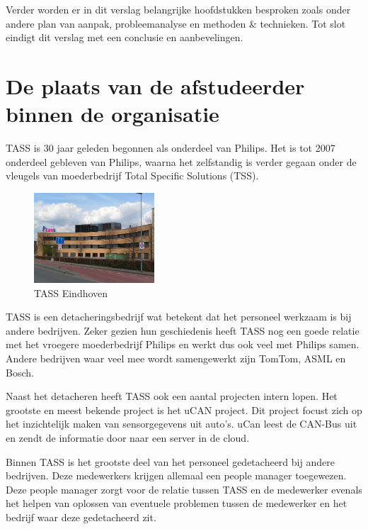 \documentclass[]{article}
\begin{document}
Verder worden er in dit verslag belangrijke hoofdstukken besproken zoals onder andere
plan van aanpak, probleemanalyse en methoden \& technieken.
Tot slot eindigt dit verslag met een conclusie en aanbevelingen.

\newpage
\section{De plaats van de afstudeerder binnen de organisatie}

TASS is 30 jaar geleden begonnen als onderdeel van Philips. Het is tot 2007
onderdeel gebleven van Philips, waarna het zelfstandig is verder gegaan
onder de vleugels van moederbedrijf Total Specific Solutions (TSS).

\begin{figure}
  \begin{center}
    \includegraphics[width=0.40\textwidth]{tass_eindhoven.pdf}
  \end{center}
  \caption{TASS Eindhoven}
\end{figure}

TASS is een detacheringsbedrijf wat betekent dat het personeel werkzaam is bij
andere bedrijven. Zeker gezien hun geschiedenis heeft TASS nog een goede
relatie met het vroegere moederbedrijf Philips en werkt dus ook veel met Philips
samen. Andere bedrijven waar veel mee wordt samengewerkt zijn TomTom, ASML
en Bosch.

Naast het detacheren heeft TASS ook een aantal projecten intern lopen. Het
grootste en meest bekende project is het uCAN project. Dit project
focust zich op het inzichtelijk maken van sensorgegevens uit auto's. uCan
leest de CAN-Bus uit en zendt de informatie door naar een server in de
cloud.

Binnen TASS is het grootste deel van het personeel gedetacheerd bij andere
bedrijven. Deze medewerkers krijgen allemaal een people manager toegewezen.
Deze people manager zorgt voor de relatie tussen TASS en de medewerker evenals
het helpen van oplossen van eventuele problemen tussen de medewerker en het bedrijf waar deze
gedetacheerd zit.
\end{document}
